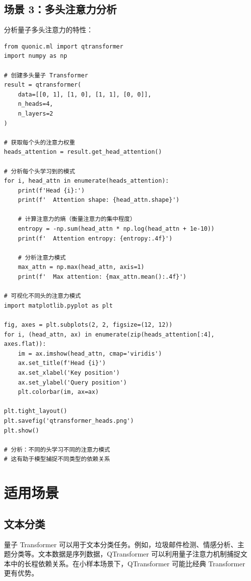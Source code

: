 \documentclass[12pt,a4paper]{article}
\begin{document}
\subsection{场景 3：多头注意力分析}

分析量子多头注意力的特性：

\begin{verbatim}
from quonic.ml import qtransformer
import numpy as np

# 创建多头量子 Transformer
result = qtransformer(
    data=[[0, 1], [1, 0], [1, 1], [0, 0]],
    n_heads=4,
    n_layers=2
)

# 获取每个头的注意力权重
heads_attention = result.get_head_attention()

# 分析每个头学习到的模式
for i, head_attn in enumerate(heads_attention):
    print(f'Head {i}:')
    print(f'  Attention shape: {head_attn.shape}')

    # 计算注意力的熵（衡量注意力的集中程度）
    entropy = -np.sum(head_attn * np.log(head_attn + 1e-10))
    print(f'  Attention entropy: {entropy:.4f}')

    # 分析注意力模式
    max_attn = np.max(head_attn, axis=1)
    print(f'  Max attention: {max_attn.mean():.4f}')

# 可视化不同头的注意力模式
import matplotlib.pyplot as plt

fig, axes = plt.subplots(2, 2, figsize=(12, 12))
for i, (head_attn, ax) in enumerate(zip(heads_attention[:4], axes.flat)):
    im = ax.imshow(head_attn, cmap='viridis')
    ax.set_title(f'Head {i}')
    ax.set_xlabel('Key position')
    ax.set_ylabel('Query position')
    plt.colorbar(im, ax=ax)

plt.tight_layout()
plt.savefig('qtransformer_heads.png')
plt.show()

# 分析：不同的头学习不同的注意力模式
# 这有助于模型捕捉不同类型的依赖关系
\end{verbatim}

\section{适用场景}

\subsection{文本分类}

量子 Transformer 可以用于文本分类任务。例如，垃圾邮件检测、情感分析、主题分类等。文本数据是序列数据，QTransformer 可以利用量子注意力机制捕捉文本中的长程依赖关系。在小样本场景下，QTransformer 可能比经典 Transformer 更有优势。
\end{document}
